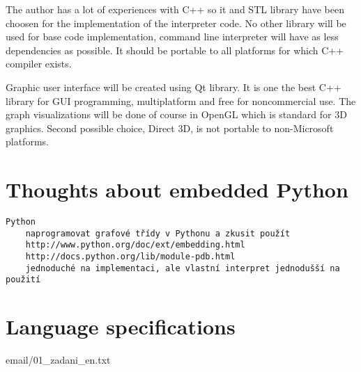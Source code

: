 \documentclass[11pt,twoside,a4paper]{book}
\begin{document}
The author has a lot of experiences with C++ so it and STL library have been choosen for the implementation of the interpreter code. No other library will be used for base code implementation, command line interpreter will have as less dependencies as possible. It should be portable to all platforms for which C++ compiler exists.

Graphic user interface will be created using Qt library. It is one the best C++ library for GUI programming, multiplatform and free for noncommercial use. The graph visualizations will be done of course in OpenGL which is standard for 3D graphics. Second possible choice, Direct 3D, is not portable to non-Microsoft platforms.


\section{Thoughts about embedded Python}

\begin{verbatim}
Python
	naprogramovat grafové třídy v Pythonu a zkusit použít
	http://www.python.org/doc/ext/embedding.html
	http://docs.python.org/lib/module-pdb.html
	jednoduché na implementaci, ale vlastní interpret jednodušší na použití
\end{verbatim}


\section{Language specifications}

email/01\_zadani\_en.txt
\end{document}
